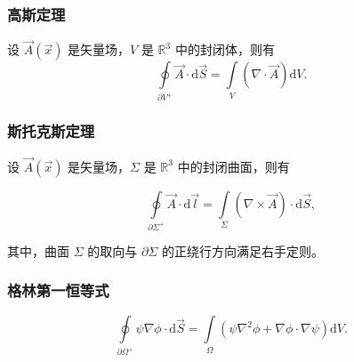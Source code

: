 \subsubsection{高斯定理}

\begin{theorem}
设 $\vec{A}(\vec{x}) $ 是矢量场，$V $ 是 $\mathbb{R}^3 $ 中的封闭体，则有
\begin{equation}
\oint\limits_{\partial V^+} \vec{A}\cdot\mathrm{d}\vec{S}
=\int\limits_{V} \left(\nabla\cdot\vec{A}\right)\mathrm{d}V.
\end{equation}
\end{theorem}

\subsubsection{斯托克斯定理}

\begin{theorem}
设 $\vec{A}(\vec{x}) $ 是矢量场，$\Sigma $ 是 $\mathbb{R}^3 $ 中的封闭曲面，则有

\begin{equation}
\oint\limits_{\partial\Sigma^+}\vec{A}\cdot\mathrm{d}\vec{l}
=\int\limits_{\Sigma} \left(\nabla\times\vec{A}\right)\cdot\mathrm{d}\vec{S},
\end{equation}

其中，曲面 $\Sigma $ 的取向与 $\partial\Sigma $ 的正绕行方向满足右手定则。

\end{theorem}

\subsubsection{格林第一恒等式}

\begin{example}
\begin{equation}
\oint\limits_{\partial\Omega^+} \psi\nabla\phi\cdot\mathrm{d}\vec{S}
=\int\limits_{\Omega} \left(\psi\nabla^2\phi + \nabla\phi\cdot \nabla\psi \right)\mathrm{d}V.
\end{equation}
\end{example}

